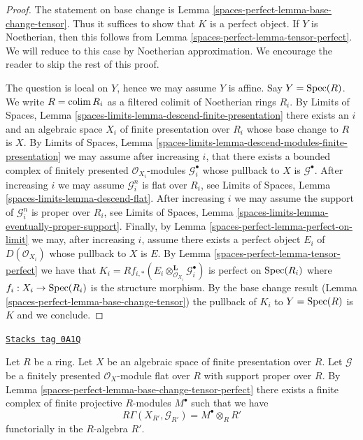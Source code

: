 \begin{proof}
The statement on base change is Lemma \ref{spaces-perfect-lemma-base-change-tensor}.
Thus it suffices to show that $K$ is a perfect object. If $Y$ is
Noetherian, then this follows from
Lemma \ref{spaces-perfect-lemma-tensor-perfect}.
We will reduce to this case by Noetherian approximation.
We encourage the reader to skip the rest of this proof.

\medskip\noindent
The question is local on $Y$, hence we may assume $Y$ is affine.
Say $Y = \operatorname{Spec}(R)$. We write $R = \operatorname{colim} R_i$ as a filtered colimit
of Noetherian rings $R_i$. By Limits of Spaces, Lemma
\ref{spaces-limits-lemma-descend-finite-presentation}
there exists an $i$ and an algebraic space $X_i$ of finite presentation
over $R_i$ whose base change to $R$ is $X$. By
Limits of Spaces, Lemma
\ref{spaces-limits-lemma-descend-modules-finite-presentation}
we may assume after increasing $i$, that there exists a
bounded complex of finitely
presented $\mathcal{O}_{X_i}$-modules $\mathcal{G}_i^\bullet$ whose
pullback to $X$ is $\mathcal{G}^\bullet$. After increasing $i$
we may assume $\mathcal{G}_i^n$ is flat over $R_i$, see
Limits of Spaces, Lemma
\ref{spaces-limits-lemma-descend-flat}.
After increasing $i$ we may assume the support of $\mathcal{G}_i^n$
is proper over $R_i$, see
Limits of Spaces, Lemma \ref{spaces-limits-lemma-eventually-proper-support}.
Finally, by Lemma \ref{spaces-perfect-lemma-perfect-on-limit}
we may, after increasing $i$, assume there exists a perfect
object $E_i$ of $D(\mathcal{O}_{X_i})$ whose pullback to
$X$ is $E$. By Lemma \ref{spaces-perfect-lemma-tensor-perfect} we have that
$K_i =
Rf_{i, *}(E_i \otimes_{\mathcal{O}_{X_i}}^\mathbf{L} \mathcal{G}_i^\bullet)$
is perfect on $\operatorname{Spec}(R_i)$ where $f_i : X_i \to \operatorname{Spec}(R_i)$ is
the structure morphism. By the base change result
(Lemma \ref{spaces-perfect-lemma-base-change-tensor}) the pullback of $K_i$
to $Y = \operatorname{Spec}(R)$ is $K$ and we conclude.
\end{proof}

\begin{remark}
\label{spaces-perfect-remark-explain-perfect-direct-image}
\href{https://stacks.math.columbia.edu/tag/0A1Q}{\texttt{Stacks tag 0A1Q}}

Let $R$ be a ring. Let $X$ be an algebraic space of finite presentation over
$R$. Let $\mathcal{G}$ be a finitely presented $\mathcal{O}_X$-module
flat over $R$ with support proper over $R$. By
Lemma \ref{spaces-perfect-lemma-base-change-tensor-perfect}
there exists a finite complex of finite projective $R$-modules
$M^\bullet$ such that we have
$$
R\Gamma(X_{R'}, \mathcal{G}_{R'}) = M^\bullet \otimes_R R'
$$
functorially in the $R$-algebra $R'$.
\end{remark}

